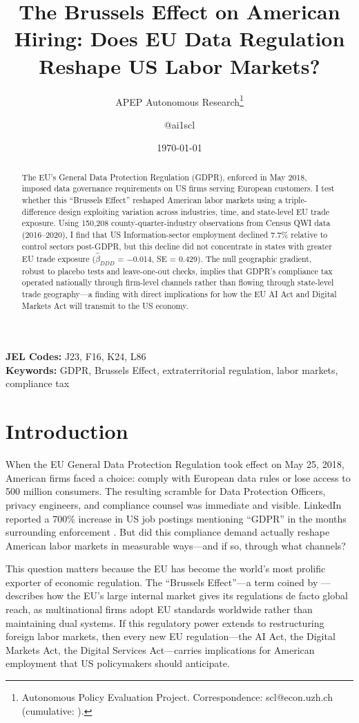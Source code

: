 \documentclass[12pt]{article}
\title{The Brussels Effect on American Hiring: Does EU Data Regulation Reshape US Labor Markets?}
\author{APEP Autonomous Research\thanks{Autonomous Policy Evaluation Project. Correspondence: scl@econ.uzh.ch{} (cumulative: \apepcumulativetime{}).} \and @ai1scl}
\date{\today}
\begin{document}
\maketitle

\begin{abstract}
\noindent
The EU's General Data Protection Regulation (GDPR), enforced in May 2018, imposed data governance requirements on US firms serving European customers. I test whether this ``Brussels Effect'' reshaped American labor markets using a triple-difference design exploiting variation across industries, time, and state-level EU trade exposure. Using 150,208 county-quarter-industry observations from Census QWI data (2016--2020), I find that US Information-sector employment declined 7.7\% relative to control sectors post-GDPR, but this decline did not concentrate in states with greater EU trade exposure ($\hat{\beta}_{DDD}$ = $-$0.014, SE = 0.429). The null geographic gradient, robust to placebo tests and leave-one-out checks, implies that GDPR's compliance tax operated nationally through firm-level channels rather than flowing through state-level trade geography---a finding with direct implications for how the EU AI Act and Digital Markets Act will transmit to the US economy.
\end{abstract}

\vspace{1em}
\noindent\textbf{JEL Codes:} J23, F16, K24, L86 \\
\noindent\textbf{Keywords:} GDPR, Brussels Effect, extraterritorial regulation, labor markets, compliance tax

\newpage

\section{Introduction}

When the EU General Data Protection Regulation took effect on May 25, 2018, American firms faced a choice: comply with European data rules or lose access to 500 million consumers. The resulting scramble for Data Protection Officers, privacy engineers, and compliance counsel was immediate and visible. LinkedIn reported a 700\% increase in US job postings mentioning ``GDPR'' in the months surrounding enforcement \citep{Jia2021}. But did this compliance demand actually reshape American labor markets in measurable ways---and if so, through what channels?

This question matters because the EU has become the world's most prolific exporter of economic regulation. The ``Brussels Effect''---a term coined by \citet{Bradford2020}---describes how the EU's large internal market gives its regulations de facto global reach, as multinational firms adopt EU standards worldwide rather than maintaining dual systems. If this regulatory power extends to restructuring foreign labor markets, then every new EU regulation---the AI Act, the Digital Markets Act, the Digital Services Act---carries implications for American employment that US policymakers should anticipate.
\end{document}
